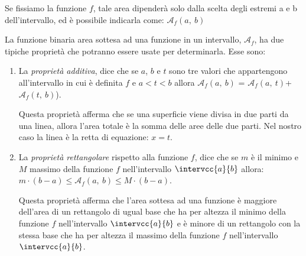 
Se fissiamo la funzione \(f\), tale area dipenderà solo dalla scelta 
degli estremi a e b dell'intervallo, ed è possibile indicarla come: \qquad
\(\mathcal{A}_f(a,~b)\)

\bigskip
La funzione binaria area sottesa ad una funzione in un 
intervallo, \(\mathcal{A}_f\), ha due tipiche proprietà che potranno essere 
usate per determinarla. Esse sono: 

\begin{enumerate}
 \item
La \emph{proprietà additiva}, dice che se \(a\), \(b\) e \(t\) 
sono tre valori che appartengono all'intervallo in cui è definita \(f\) e 
\quad \(a < t < b\) \quad allora \quad 
\(\mathcal{A}_f(a,~b)\) = \(\mathcal{A}_f(a,~t)\)+\(\mathcal{A}_f(t,~b)\)).


Questa proprietà afferma che se una superficie 
viene divisa in due parti da una linea, 
allora l'area totale è la somma delle aree delle due parti.
Nel nostro caso la linea è la retta di equazione: \(x = t\).

 \item 
La \emph{proprietà rettangolare} rispetto alla funzione \(f\), 
dice che se \(m\) è il minimo e \(M\) massimo della funzione \(f\) 
nell'intervallo \(\intervcc{a}{b}\)
allora: \quad
\(m\cdot(b-a) \leq \mathcal{A}_f(a,~b) \leq M\cdot(b-a)\).

% 

Questa proprietà afferma che l'area sottesa ad una funzione è maggiore 
dell'area di un rettangolo di ugual base che ha per altezza il minimo della 
funzione \(f\) nell'intervallo \(\intervcc{a}{b}\) 
e è minore di un rettangolo con la stessa base che ha per altezza il massimo 
della funzione \(f\) nell'intervallo \(\intervcc{a}{b}\). 
\end{enumerate}

